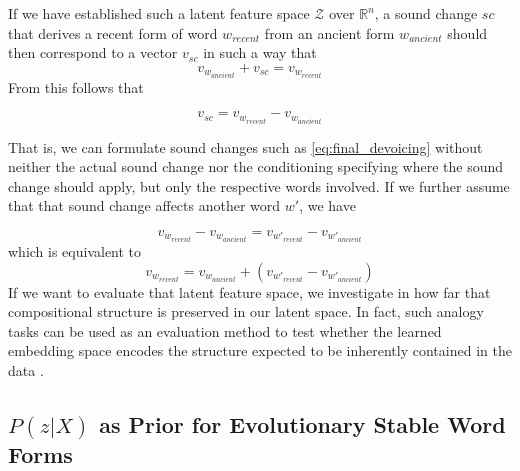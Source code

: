 \documentclass[8pt]{article}
\begin{document}
If we have established such a latent feature space $\mathcal{Z}$ over $\mathbb{R}^n$, a sound change $sc$ that derives a recent form of word $w_{recent}$ from an ancient form  $w_{ancient}$ should then correspond to a vector $v_{sc}$ in such a way that 
\begin{equation}
\label{eq:sound_change_linear_dependency}
v_{w_{ancient}}+v_{sc} = v_{w_{recent}}
\end{equation}
From this follows that 

\begin{equation}
v_{sc} =  v_{w_{recent}} - v_{w_{ancient}} 
\end{equation}

That is, we can formulate sound changes such as \ref{eq:final_devoicing} without neither the actual sound change nor the conditioning specifying where the sound change should apply, but only the respective words involved.
If we further assume that that sound change affects another word $w'$, we have

\begin{equation}
v_{w_{recent}} - v_{w_{ancient}}  =  v_{w'_{recent}} - v_{w'_{ancient}} 
\end{equation}
which is equivalent to
\begin{equation}
v_{w_{recent}}  =   v_{w_{ancient}}  + (v_{w'_{recent}} - v_{w'_{ancient}}) 
\end{equation}
If we want to evaluate that latent feature space, we investigate in how far that compositional structure is preserved in our latent space. In fact, such analogy tasks can be used as an evaluation method to test whether the learned embedding space encodes the structure expected to be inherently contained in the data \cite{mikolov2013distributed}.

\subsection{$P(z|X)$ as Prior for Evolutionary Stable Word Forms}
\end{document}
